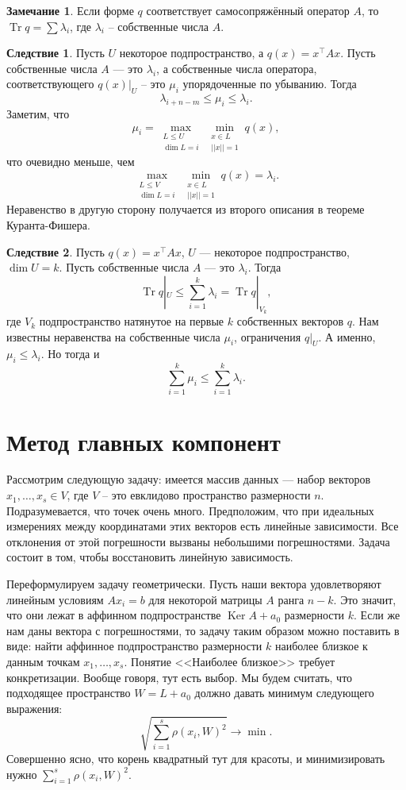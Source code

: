 \documentclass[10pt,a4paper,oneside]{book}
\theoremstyle{definition}
\newtheorem*{rem}{Замечание}
\newtheorem{cor}{Следствие}
\DeclareMathOperator{\Ker}{Ker}
\newcommand{\Tr}{\operatorname{Tr}}
\def\crl{\begin{cor}}
\def\ecrl{\end{cor}}
\def\rm{\begin{rem}}
\def\erm{\end{rem}}
\begin{document}
\rm Если форме $q$ соответствует самосопряжённый оператор $A$, то $\Tr q=\sum \lambda_i$, где $\lambda_i$ -- собственные числа $A$.
\erm

\crl Пусть $U$ некоторое подпространство, а $q(x)=x^{\top} Ax$. Пусть собственные числа $A$ --- это $\lambda_i$, а собственные числа оператора, соответствующего $q(x)|_U$ -- это $\mu_i$ упорядоченные по убыванию. Тогда 
$$\lambda_{i+n-m}\leq \mu_i\leq \lambda_i.$$  
\proof Заметим, что
 $$\mu_i=\max_{\substack{L\leq U\\ \dim L=i}} \min_{\substack{ x\in L \\ ||x||=1}} q(x),$$
что очевидно меньше, чем 
$$\max_{\substack{L\leq V\\ \dim L=i}} \min_{\substack{ x\in L \\ ||x||=1}} q(x)=\lambda_i.$$ Неравенство в другую сторону получается из второго описания в теореме Куранта-Фишера.
\endproof
\ecrl




\crl Пусть $q(x)=x^{\top} Ax$, $U$ --- некоторое подпространство, $\dim U=k$. Пусть собственные числа $A$ --- это $\lambda_i$. Тогда $$\Tr q|_U\leq \sum_{i=1}^k \lambda_i= \Tr q|_{V_k},$$
где $V_k$ подпространство натянутое на первые $k$ собственных векторов $q$.
\proof Нам известны неравенства на собственные числа $\mu_i$, ограничения $q|_U$. А именно, $\mu_i\leq \lambda_i$. Но тогда и $$\sum_{i=1}^k \mu_i \leq \sum_{i=1}^k \lambda_i.$$
\endproof
\ecrl 








\section{Метод главных компонент}

Рассмотрим следующую задачу: имеется массив данных --- набор векторов $x_1,\dots,x_s \in V$, где $V$ -- это евклидово пространство размерности $n$. Подразумевается, что точек очень много. Предположим, что при идеальных измерениях между координатами этих векторов есть линейные зависимости. Все отклонения от этой погрешности вызваны небольшими погрешностями. Задача состоит в том, чтобы восстановить линейную зависимость. 


Переформулируем задачу геометрически. Пусть наши вектора удовлетворяют линейным условиям $Ax_i=b$ для некоторой матрицы $A$ ранга $n-k$. Это значит, что они лежат в аффинном подпространстве $\Ker A + a_0$ размерности $k$. Если же нам даны вектора с погрешностями, то задачу таким образом можно поставить в виде: найти аффинное подпространство размерности $k$ наиболее близкое к данным точкам $x_1,\dots,x_s$. Понятие <<Наиболее близкое>> требует конкретизации. Вообще говоря, тут есть выбор. Мы будем считать, что подходящее пространство $W=L+a_0$ должно давать минимум следующего выражения:
$$\sqrt{\sum_{i=1}^s \rho(x_i,W)^2} \to \min.$$
Совершенно ясно, что корень квадратный тут для красоты, и минимизировать нужно $\sum_{i=1}^s \rho(x_i,W)^2$.
\end{document}
